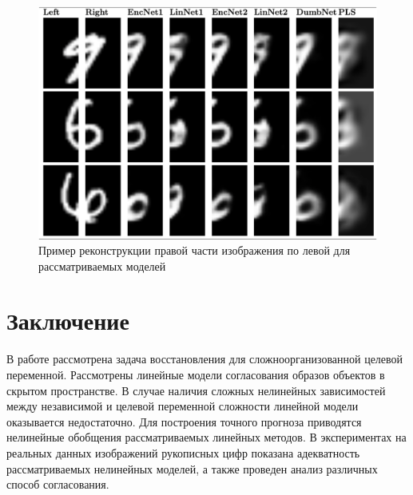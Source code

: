 \documentclass[12pt]{article}
\begin{document}
	\begin{figure}[h!]
		\begin{center}
			\includegraphics[width=\linewidth]{figures/mnist_preds}
		\end{center}
		\caption{Пример реконструкции правой части изображения по левой для рассматриваемых моделей}
		\label{fgr:2}
	\end{figure}

	\section{Заключение}
	В работе рассмотрена задача восстановления для сложноорганизованной целевой переменной.
	Рассмотрены линейные модели согласования образов объектов в скрытом пространстве.
	В случае наличия сложных нелинейных зависимостей между независимой и целевой переменной сложности линейной модели оказывается недостаточно.
	Для построения точного прогноза приводятся нелинейные обобщения рассматриваемых линейных методов.
	В экспериментах на реальных данных изображений рукописных цифр показана адекватность рассматриваемых нелинейных моделей, а также проведен анализ различных способ согласования.
	
\end{document}
